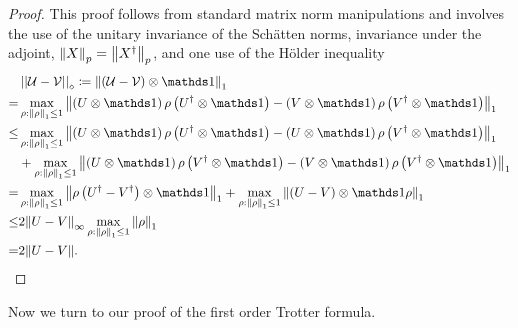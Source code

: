 \begin{proof}
    This proof follows from standard matrix norm manipulations and involves the use of the unitary invariance of the Sch\"{a}tten norms, invariance under the adjoint, $\norm{X}_p = \norm{X^\dagger}_p$, and one use of the H\"{o}lder inequality
    \begin{align}
        &\diamondnorm{\mathcal{U} - \mathcal{V}} \coloneqq \norm{\parens{\mathcal{U} - \mathcal{V}}\otimes \openone}_1 \label{eq:diamond_to_spectral_start} \\
        =& \max_{\rho : \norm{\rho}_1 \leq 1} \norm{\parens{U \otimes \openone} \rho \parens{U^\dagger \otimes \openone} - \parens{V \otimes \openone} \rho \parens{V^\dagger \otimes \openone} }_1 \\
        \leq& \max_{\rho : \norm{\rho}_1 \leq 1} \norm{\parens{U \otimes \openone} \rho \parens{U^\dagger \otimes \openone} - \parens{U \otimes \openone} \rho \parens{V^\dagger \otimes \openone} }_1 \\
        ~& +\max_{\rho : \norm{\rho}_1 \leq 1} \norm{\parens{U \otimes \openone} \rho \parens{V^\dagger \otimes \openone}  - \parens{V \otimes \openone} \rho \parens{V^\dagger \otimes \openone} }_1 \nonumber \\
        =& \max_{\rho : \norm{\rho}_1 \leq 1} \norm{\rho \parens{U^\dagger - V^\dagger}\otimes \openone}_1 + \max_{\rho : \norm{\rho}_1 \leq 1} \norm{\parens{U - V}\otimes \openone \rho}_1 \\
        \leq & 2 \norm{U - V}_\infty \max_{\rho : \norm{\rho}_1 \leq 1} \norm{\rho}_1 \\
        = & 2 \norm{U - V}. \label{eq:TS_intermediate_1}
    \end{align}
\end{proof}
Now we turn to our proof of the first order Trotter formula.
